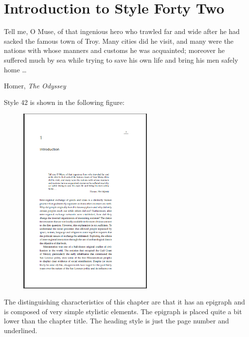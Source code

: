 
\chapter{Introduction to Style Forty Two}

\epigraph{Tell me, O Muse, of that ingenious hero who trawled far and wide after he had
sacked the famous town of Troy. Many cities did he visit, and many were the nations with whose manners
and customs he was acquainted; moreover he suffered much by sea while trying to save his own life and bring
his men safely home \ldots }{Homer, \textit{The Odyssey}}

Style 42 is shown in the following figure:

\begin{figure}[ht]
\centering
\includegraphics[width=0.6\textwidth]{./chapters/chapter42.png}
\end{figure}
The distinguishing characteristics of this chapter are that it has an epigraph and is composed of very simple stylistic elements. The epigraph is placed quite a bit lower than the chapter title. The heading style is just the page number and underlined.



